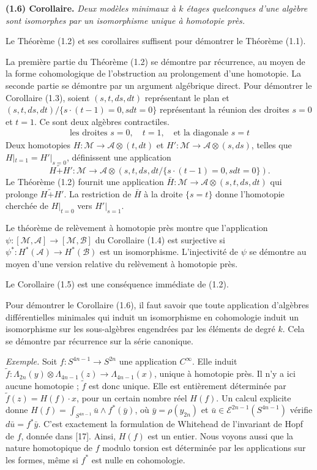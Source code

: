 \documentclass[
  french,
  a3paper,
  a3paper]{extarticle}
\begin{document}
\fontsize{9}{11}\selectfont

\textbf{(1.6) Corollaire.} \emph{Deux modèles minimaux à \(k\) étages
quelconques d'une algèbre sont isomorphes par un isomorphisme unique à
homotopie près.}

Le Théorème (1.2) et ses corollaires suffisent pour démontrer le
Théorème (1.1).

La première partie du Théorème (1.2) se démontre par récurrence, au
moyen de la forme cohomologique de l'obstruction au prolongement d'une
homotopie. La seconde partie se démontre par un argument algébrique
direct. Pour démontrer le Corollaire (1.3), soient \((s,t,ds,dt)\)
représentant le plan et \((s,t,ds,dt)/\{s\cdot(t-1)=0,sdt=0\}\)
représentant la réunion des droites \(s=0\) et \(t=1\). Ce sont deux
algèbres contractiles. \[
\begin{array}{c}
\text{les droites }s=0,\quad t=1,\quad\text{et la diagonale }s=t
\end{array}
\] Deux homotopies \(H:\mathcal M\to\mathscr A\otimes(t,dt)\) et
\(H':\mathcal M\to\mathscr A\otimes(s,ds)\), telles que
\(H|_{t=1}=H'|_{s=0}\), définissent une application \[
H\mathrel{\widetilde{+}}H':\mathcal M\to\mathscr A\otimes(s,t,ds,dt/\{s\cdot(t-1)=0,sdt=0\}).
\] Le Théorème (1.2) fournit une application
\(\bar H:\mathcal M\to\mathscr A\otimes(s,t,ds,dt)\) qui prolonge
\(H\mathrel{\widetilde{+}}H'\). La restriction de \(\bar H\) à la droite
\(\{s=t\}\) donne l'homotopie cherchée de \(H|_{t=0}\) vers
\(H'|_{s=1}\).

Le théorème de relèvement à homotopie près montre que l'application
\(\psi:[\mathcal M,\mathscr A]\to[\mathcal M,\mathscr B]\) du Corollaire
(1.4) est surjective si \(\psi^*:H^*(\mathscr A)\to H^*(\mathscr B)\)
est un isomorphisme. L'injectivité de \(\psi\) se démontre au moyen
d'une version relative du relèvement à homotopie près.

Le Corollaire (1.5) est une conséquence immédiate de (1.2).

Pour démontrer le Corollaire (1.6), il faut savoir que toute application
d'algèbres différentielles minimales qui induit un isomorphisme en
cohomologie induit un isomorphisme sur les sous-algèbres engendrées par
les éléments de degré \(k\). Cela se démontre par récurrence sur la
série canonique.

\emph{Exemple.} Soit \(f:S^{4n-1}\to S^{2n}\) une application
\(C^\infty\). Elle induit
\(\tilde f:\Lambda_{2n}(y)\otimes\Lambda_{4n-1}(z)\to\Lambda_{4n-1}(x)\),
unique à homotopie près. Il n'y a ici aucune homotopie ; \(\tilde f\)
est donc unique. Elle est entièrement déterminée par
\(\tilde f(z)=H(f)\cdot x\), pour un certain nombre réel \(H(f)\). Un
calcul explicite donne \(H(f)=\int_{S^{4n-1}}\bar u\wedge f^*(\bar y)\),
où \(\bar y=\rho(y_{2n})\) et \(\bar u\in\mathscr E^{2n-1}(S^{4n-1})\)
vérifie \(d\bar u=f^*\bar y\). C'est exactement la formulation de
Whitehead de l'invariant de Hopf de \(f\), donnée dans {[}17{]}. Ainsi,
\(H(f)\) est un entier. Nous voyons aussi que la nature homotopique de
\(f\) modulo torsion est déterminée par les applications sur les formes,
même si \(f^*\) est nulle en cohomologie.
\end{document}
